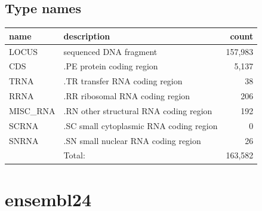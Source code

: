 \documentclass{article}
\begin{document}
\begin{Schunk}
\subsection{Type names}
\noindent\begin{tabular}{llr}
\hline \hline
name & description & count \\
\hline
LOCUS  &  sequenced DNA fragment  &  157,983 \\
CDS  &  .PE protein coding region  &  5,137 \\
TRNA  &  .TR transfer RNA coding region  &  38 \\
RRNA  &  .RR ribosomal RNA coding region  &  206 \\
MISC\_RNA  &  .RN other structural RNA coding region  &  192 \\
SCRNA  &  .SC small cytoplasmic RNA coding region  &  0 \\
SNRNA  &  .SN small nuclear RNA coding region  &  26 \\
\hline
 & Total: & 163,582 \\
\hline \hline
\end{tabular}

\section{ ensembl24 }

\end{Schunk}
\end{document}
